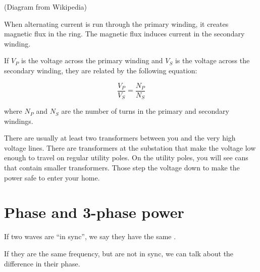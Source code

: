 (Diagram from Wikipedia)

When alternating current is run through the primary winding, it creates magnetic
flux in the ring. The magnetic flux induces current in the secondary
winding.

If $V_P$ is the voltage across the primary winding and $V_S$ is the
voltage across the secondary winding, they are related by the
following equation:

$$\frac{V_P}{V_S} = \frac{N_P}{N_S}$$

where $N_P$ and $N_S$ are the number of turns in the primary and
secondary windings.

There are usually at least two transformers between you and the very
high voltage lines. There are transformers at the substation that make
the voltage low enough to travel on regular utility poles. On the
utility poles, you will see cans that contain smaller
transformers. Those step the voltage down to make the power safe to
enter your home.

\section{Phase and 3-phase power}

If two waves are ``in sync'', we say they have the same .


If they are the same frequency, but are not in sync, we can talk about
the difference in their phase.


